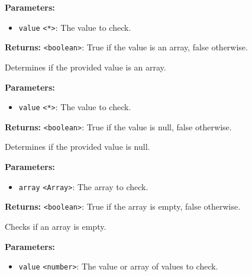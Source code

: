 \documentclass[12pt,a4paper]{article}
\begin{document}
\noindent \textbf{Parameters:}
\begin{itemize}
  \item \texttt{value} \texttt{<*>}: The value to check.
\end{itemize}

\noindent \textbf{Returns:} \texttt{<boolean>}: True if the value is an array, false otherwise.

\noindent Determines if the provided value is an array.

\vspace{5mm}
\noindent {}


\noindent \textbf{Parameters:}
\begin{itemize}
  \item \texttt{value} \texttt{<*>}: The value to check.
\end{itemize}

\noindent \textbf{Returns:} \texttt{<boolean>}: True if the value is null, false otherwise.

\noindent Determines if the provided value is null.

\vspace{5mm}
\noindent {}


\noindent \textbf{Parameters:}
\begin{itemize}
  \item \texttt{array} \texttt{<Array>}: The array to check.
\end{itemize}

\noindent \textbf{Returns:} \texttt{<boolean>}: True if the array is empty, false otherwise.

\noindent Checks if an array is empty.

\vspace{5mm}
\noindent {}


\noindent \textbf{Parameters:}
\begin{itemize}
  \item \texttt{value} \texttt{<number>}: The value or array of values to check.
\end{itemize}
\end{document}
